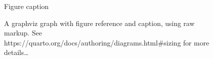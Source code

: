 \documentclass[
  10pt,
  oneside,
  cleardoublepage=empty,
  numbers=noenddot,
  titlepage,
  toclink=all,
  toc=bibliography,
  headinclude,
  footinclude]{scrbook}
\theoremstyle{plain}
\theoremstyle{plain}
\theoremstyle{definition}
\theoremstyle{definition}
\theoremstyle{plain}
\theoremstyle{plain}
\theoremstyle{definition}
\theoremstyle{plain}
\theoremstyle{remark}
\begin{document}
\begin{figure}


\caption{\label{fig-dot-a}Figure caption}

\end{figure}%

\begin{figure}


\caption{\label{fig-dot-b}A graphviz graph with figure reference and
caption, using raw markup. See
https://quarto.org/docs/authoring/diagrams.html\#sizing for more
details\ldots{}}

\end{figure}%
\end{document}
